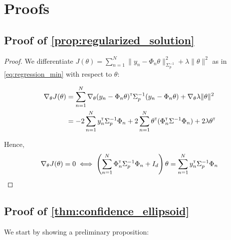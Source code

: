 \documentclass{article}
\begin{document}



\clearpage
\appendix

\section{Proofs}

\subsection{Proof of \autoref{prop:regularized_solution}}

\begin{proof}
We differentiate $J(\theta) = \sum_{n=1}^N \|y_n -\Phi_n\theta\|_{\Sigma_p^{-1}}^2 + \lambda\|\theta\|_{}^2$ as in  \eqref{eq:regression_min} with respect to $\theta$:

\begin{align*}
    \nabla_{\theta} J(\theta) &= \sum_{n=1}^N\nabla_{\theta} (y_n - \Phi_n\theta)^{\mathsf{\scriptscriptstyle T}}\Sigma_p^{-1}(y_n - \Phi_n\theta) + \nabla_{\theta} \lambda\|\theta\|_{}^2\\
    &= -2\sum_{n=1}^N y_n^{\mathsf{\scriptscriptstyle T}}\Sigma_p^{-1}\Phi_n + 2\sum_{n=1}^N\theta^{\mathsf{\scriptscriptstyle T}}(\Phi_n^{\mathsf{\scriptscriptstyle T}}\Sigma^{-1}\Phi_n) +  2 \lambda \theta^{\mathsf{\scriptscriptstyle T}}
\end{align*}

Hence,
\begin{align*}
    \nabla_{\theta} J(\theta) = 0 \iff \left(\sum_{n=1}^N\Phi_n^{\mathsf{\scriptscriptstyle T}}\Sigma_p^{-1}\Phi_n + I_d\right)\theta = \sum_{n=1}^N y_n^{\mathsf{\scriptscriptstyle T}}\Sigma_p^{-1}\Phi_n
\end{align*}
\end{proof}

\subsection{Proof of \autoref{thm:confidence_ellipsoid}}

We start by showing a preliminary proposition:
\end{document}
